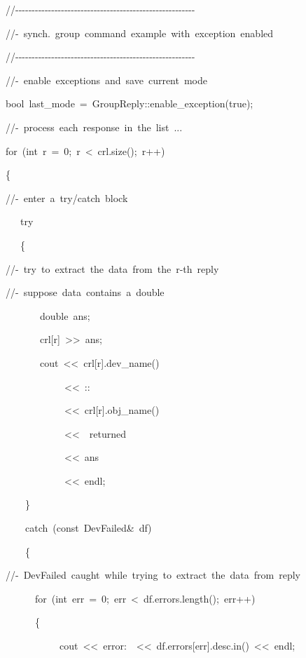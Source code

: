
\begin{lyxcode}
//-{}-{}-{}-{}-{}-{}-{}-{}-{}-{}-{}-{}-{}-{}-{}-{}-{}-{}-{}-{}-{}-{}-{}-{}-{}-{}-{}-{}-{}-{}-{}-{}-{}-{}-{}-{}-{}-{}-{}-{}-{}-{}-{}-{}-{}-{}-{}-{}-{}-{}-{}-{}-{}-{}-

//-~synch.~group~command~example~with~exception~enabled

//-{}-{}-{}-{}-{}-{}-{}-{}-{}-{}-{}-{}-{}-{}-{}-{}-{}-{}-{}-{}-{}-{}-{}-{}-{}-{}-{}-{}-{}-{}-{}-{}-{}-{}-{}-{}-{}-{}-{}-{}-{}-{}-{}-{}-{}-{}-{}-{}-{}-{}-{}-{}-{}-{}-

//-~enable~exceptions~and~save~current~mode

bool~last\_mode~=~GroupReply::enable\_exception(true);

//-~process~each~response~in~the~list~...

for~(int~r~=~0;~r~<~crl.size();~r++)

\{

//-~enter~a~try/catch~block

~~~try

~~~\{

//-~try~to~extract~the~data~from~the~r-th~reply

//-~suppose~data~contains~a~double

~~~~~~~double~ans;

~~~~~~~crl{[}r{]}~>\textcompwordmark{}>~ans;

~~~~~~~cout~<\textcompwordmark{}<~crl{[}r{]}.dev\_name()

~~~~~~~~~~~~<\textcompwordmark{}<~\textquotedbl{}::\textquotedbl{}

~~~~~~~~~~~~<\textcompwordmark{}<~crl{[}r{]}.obj\_name()

~~~~~~~~~~~~<\textcompwordmark{}<~\textquotedbl{}~returned~\textquotedbl{}

~~~~~~~~~~~~<\textcompwordmark{}<~ans

~~~~~~~~~~~~<\textcompwordmark{}<~endl;

~~~~\}

~~~~catch~(const~DevFailed\&~df)

~~~~\{

//-~DevFailed~caught~while~trying~to~extract~the~data~from~reply

~~~~~~for~(int~err~=~0;~err~<~df.errors.length();~err++)

~~~~~~\{

~~~~~~~~~~~cout~<\textcompwordmark{}<~\textquotedbl{}error:~\textquotedbl{}~<\textcompwordmark{}<~df.errors{[}err{]}.desc.in()~<\textcompwordmark{}<~endl;


\end{lyxcode}
